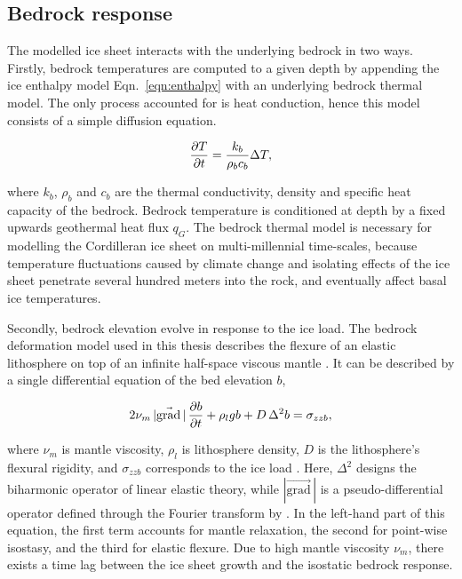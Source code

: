 \documentclass{article}
\renewcommand{\grad}[1]{\vec{\mathrm{grad}}\,#1}
\newcommand{\eqn}[1]{Eqn.~\ref{eqn:#1}}
\begin{document}
\subsection{Bedrock response}

The modelled ice sheet interacts with the underlying bedrock in two ways.
Firstly, bedrock temperatures are computed to a given depth by appending the
ice enthalpy model \eqn{enthalpy} with an underlying bedrock thermal model.
The only process accounted for is heat conduction, hence this model consists of
a simple diffusion equation.

\begin{equation}
    \pdv{T}{t} = \frac{k_b}{\rho_b c_b} \Delta T,
\end{equation}

where $k_b$, $\rho_b$ and $c_b$ are the thermal conductivity, density and
specific heat capacity of the bedrock. Bedrock temperature is conditioned at
depth by a fixed upwards geothermal heat flux $q_G$. The bedrock thermal model
is necessary for modelling the Cordilleran ice sheet on multi-millennial
time-scales, because temperature fluctuations caused by climate change and
isolating effects of the ice sheet penetrate several hundred meters into the
rock, and eventually affect basal ice temperatures.

Secondly, bedrock elevation evolve in response to the ice load. The bedrock
deformation model used in this thesis describes the flexure of an elastic
lithosphere on top of an infinite half-space viscous mantle
\citep{Lingle.Clark.1985}. It can be described by a single differential
equation of the bed elevation $b$,

\begin{equation}
    2\nu_m\,|\grad|\,\pdv{b}{t} + \rho_l g b + D\,\Delta^2 b = \sigma_{zzb},
\end{equation}

where $\nu_m$ is mantle viscosity, $\rho_l$ is lithosphere density, $D$ is the
lithosphere's flexural rigidity, and $\sigma_{zzb}$ corresponds to the ice load
\citep{Bueler.etal.2007}. Here, $\Delta^2$ designs the biharmonic operator of
linear elastic theory, while $|\grad|$ is a pseudo-differential operator
defined through the Fourier transform by \citet[Eqn.~6]{Bueler.etal.2007}. In
the left-hand part of this equation, the first term accounts for mantle
relaxation, the second for point-wise isostasy, and the third for elastic
flexure. Due to high mantle viscosity $\nu_m$, there exists a time lag between
the ice sheet growth and the isostatic bedrock response.
\end{document}
